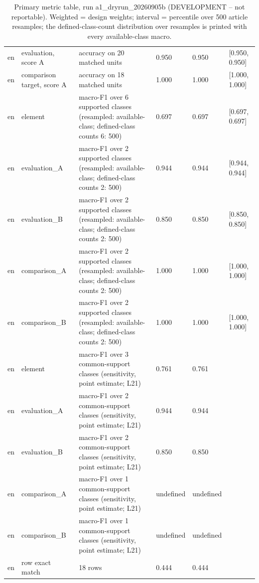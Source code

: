 \begin{table}[htbp]
\begin{tabular}{llllll}
en & evaluation, score A & accuracy on 20 matched units & 0.950 & 0.950 & [0.950, 0.950] \\
en & comparison target, score A & accuracy on 18 matched units & 1.000 & 1.000 & [1.000, 1.000] \\
en & element & macro-F1 over 6 supported classes (resampled: available-class; defined-class counts {6: 500}) & 0.697 & 0.697 & [0.697, 0.697] \\
en & evaluation\_A & macro-F1 over 2 supported classes (resampled: available-class; defined-class counts {2: 500}) & 0.944 & 0.944 & [0.944, 0.944] \\
en & evaluation\_B & macro-F1 over 2 supported classes (resampled: available-class; defined-class counts {2: 500}) & 0.850 & 0.850 & [0.850, 0.850] \\
en & comparison\_A & macro-F1 over 2 supported classes (resampled: available-class; defined-class counts {2: 500}) & 1.000 & 1.000 & [1.000, 1.000] \\
en & comparison\_B & macro-F1 over 2 supported classes (resampled: available-class; defined-class counts {2: 500}) & 1.000 & 1.000 & [1.000, 1.000] \\
en & element & macro-F1 over 3 common-support classes (sensitivity, point estimate; L21) & 0.761 & 0.761 &  \\
en & evaluation\_A & macro-F1 over 2 common-support classes (sensitivity, point estimate; L21) & 0.944 & 0.944 &  \\
en & evaluation\_B & macro-F1 over 2 common-support classes (sensitivity, point estimate; L21) & 0.850 & 0.850 &  \\
en & comparison\_A & macro-F1 over 1 common-support classes (sensitivity, point estimate; L21) & undefined & undefined &  \\
en & comparison\_B & macro-F1 over 1 common-support classes (sensitivity, point estimate; L21) & undefined & undefined &  \\
en & row exact match & 18 rows & 0.444 & 0.444 &  \\
\bottomrule
\end{tabular}
\caption{Primary metric table, run a1\_dryrun\_20260905b (DEVELOPMENT -- not reportable). Weighted = design weights; interval = percentile over 500 article resamples; the defined-class-count distribution over resamples is printed with every available-class macro.}
\end{table}
